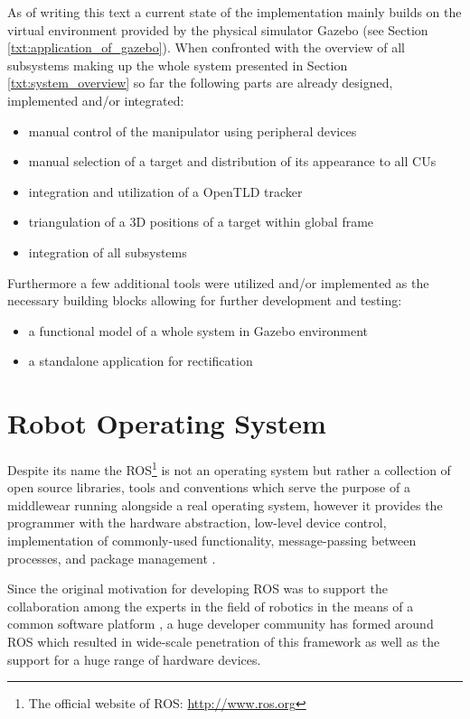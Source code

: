 As of writing this text a current state of the implementation mainly builds on the virtual environment provided by the physical simulator Gazebo (see Section \ref{txt:application_of_gazebo}). When confronted with the overview of all subsystems making up the whole system presented in Section \ref{txt:system_overview} so far the following parts are already designed, implemented and/or integrated:

\begin{itemize}
\item manual control of the manipulator using peripheral devices
\item manual selection of a target and distribution of its appearance to all CUs
\item integration and utilization of a OpenTLD tracker
\item triangulation of a 3D positions of a target within global frame
\item integration of all subsystems
\end{itemize}

Furthermore a few additional tools were utilized and/or implemented as the necessary building blocks allowing for further development and testing:

\begin{itemize}
\item a functional model of a whole system in Gazebo environment
\item a standalone application for rectification
\end{itemize}


\section{Robot Operating System} \label{txt:robot_operating_system}

Despite its name the ROS\footnote{The official website of ROS: \url{http://www.ros.org}} is not an operating system but rather a collection of open source libraries, tools and conventions which serve the purpose of a middlewear running alongside a real operating system, however it provides the programmer with the hardware abstraction,  low-level device control, implementation of commonly-used functionality,
message-passing between processes, and package management \cite{O'Kane201310}.

Since the original motivation for developing ROS was to support the collaboration among the experts in the field of robotics in the means of a common software platform \cite{ROS-an-open-source-Robot-Operating-System}, a huge developer community has formed around ROS which resulted in wide-scale penetration of this framework as well as the support for a huge range of hardware devices.

